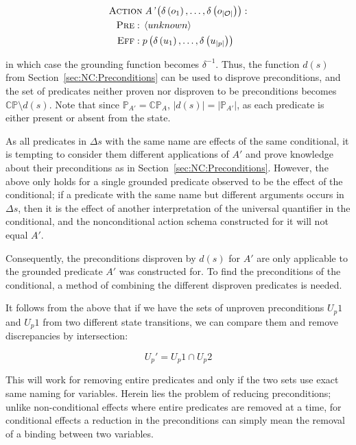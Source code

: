 \documentclass[../Master.tex]{subfiles}
\begin{document}
\begin{align*}
    \begin{split}
        \textsc{Action} &\; \textit{A'}\left(\delta \left( o_1 \right), \ldots, \delta \left( o_{|\mathcal{O}|}\right)\right): \\
        \textsc{Pre}: \; & \left< unknown \right> \\
        \textsc{Eff}: \; & p\left( \delta \left(u_1\right), \dots, \delta \left( u_{|p|} \right)\right)
    \end{split}
\end{align*}

in which case the grounding function becomes $\delta^{-1}$. Thus, the function $d(s)$ from Section~\ref{sec:NC:Preconditions} can be used to disprove preconditions, and the set of predicates neither proven nor disproven to be preconditions becomes $\mathbb{CP} \setminus d(s)$. Note that since $\mathbb{P}_{A'} = \mathbb{CP}_A$, $|d(s)| = |\mathbb{P}_{A'}|$, as each predicate is either present or absent from the state. 

As all predicates in $\Delta s$ with the same name are effects of the same conditional, it is tempting to consider them different applications of $A'$ and prove knowledge about their preconditions as in Section~\ref{sec:NC:Preconditions}. However, the above only holds for a single grounded predicate observed to be the effect of the conditional; if a predicate with the same name but different arguments occurs in $\Delta s$, then it is the effect of another interpretation of the universal quantifier in the conditional, and the nonconditional action schema constructed for it will not equal $A'$.

Consequently, the preconditions disproven by $d(s)$ for $A'$ are only applicable to the grounded predicate $A'$ was constructed for. To find the preconditions of the conditional, a method of combining the different disproven predicates is needed.

It follows from the above that if we have the sets of unproven preconditions $U_p1$ and $U_p1$ from two different state transitions, we can compare them and remove discrepancies by intersection:

\begin{equation}
\label{eq:unknownpredcondset}
	U_p' = U_p1 \cap U_p2
\end{equation}

This will work for removing entire predicates and only if the two sets use exact same naming for variables. Herein lies the problem of reducing preconditions; unlike non-conditional effects where entire predicates are removed at a time, for conditional effects a reduction in the preconditions can simply mean the removal of a binding between two variables.
\end{document}

